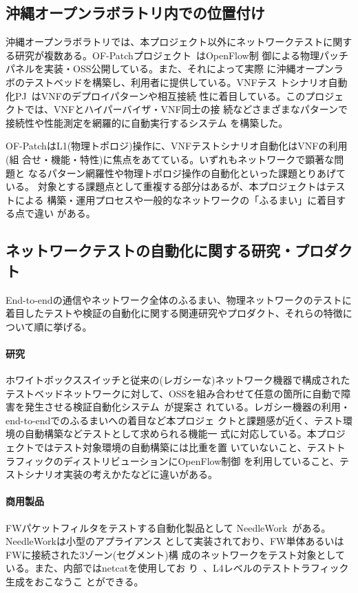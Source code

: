   \subsection{沖縄オープンラボラトリ内での位置付け}

沖縄オープンラボラトリでは、本プロジェクト以外にネットワークテストに関す
る研究が複数ある。OF-Patchプロジェクト~\cite{ool-testbedpj}はOpenFlow制
御による物理パッチパネルを実装・OSS公開している。また、それによって実際
に沖縄オープンラボのテストベッドを構築し、利用者に提供している。VNFテス
トシナリオ自動化PJ~\cite{ool-vnftestpj}はVNFのデプロイパターンや相互接続
性に着目している。このプロジェクトでは、VNFとハイパーバイザ・VNF同士の接
続などさまざまなパターンで接続性や性能測定を網羅的に自動実行するシステム
を構築した。

OF-PatchはL1(物理トポロジ)操作に、VNFテストシナリオ自動化はVNFの利用(組
合せ・機能・特性)に焦点をあてている。いずれもネットワークで顕著な問題と
なるパターン網羅性や物理トポロジ操作の自動化といった課題とりあげている。
対象とする課題点として重複する部分はあるが、本プロジェクトはテストによる
構築・運用プロセスや一般的なネットワークの「ふるまい」に着目する点で違い
がある。

  \subsection{ネットワークテストの自動化に関する研究・プロダクト}
End-to-endの通信やネットワーク全体のふるまい、物理ネットワークのテストに
着目したテストや検証の自動化に関する関連研究やプロダクト、それらの特徴に
ついて順に挙げる。

    \paragraph{研究}
ホワイトボックススイッチと従来の(レガシーな)ネットワーク機器で構成された
テストベッドネットワークに対して、OSSを組み合わせて任意の箇所に自動で障
害を発生させる検証自動化システム~\cite{wbsw-oss-test-automation}が提案さ
れている。レガシー機器の利用・end-to-endでのふるまいへの着目など本プロジェ
クトと課題感が近く、テスト環境の自動構築などテストとして求められる機能一
式に対応している。本プロジェクトではテスト対象環境の自動構築には比重を置
いていないこと、テストトラフィックのディストリビューションにOpenFlow制御
を利用していること、テストシナリオ実装の考えかたなどに違いがある。

    \paragraph{商用製品}
FWパケットフィルタをテストする自動化製品として
NeedleWork~\cite{needlework-web}がある。NeedleWorkは小型のアプライアンス
として実装されており、FW単体あるいはFWに接続された3ゾーン(セグメント)構
成のネットワークをテスト対象としている。また、内部ではnetcatを使用してお
り~\cite{needlework-slide}、L4レベルのテストトラフィック生成をおこなうこ
とができる。

